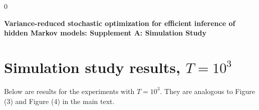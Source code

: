 \documentclass[12pt]{article}
\newcommand{\blind}{0}
\begin{document}
\blind
{
  \bigskip
  \bigskip
  \bigskip
  \begin{center}
    {\LARGE\bf Variance-reduced stochastic optimization for efficient inference of hidden Markov models: Supplement A: Simulation Study}
  \end{center}
  \medskip
} \fi


\newpage

\section{Simulation study results, $T = 10^{3}$}

Below are results for the experiments with $T=10^{3}$. They are analogous to Figure (3) and Figure (4) in the main text.
\end{document}

